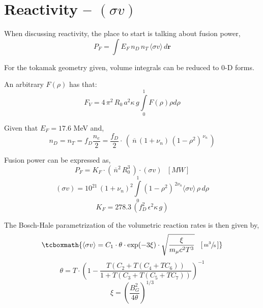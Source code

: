 \section{Reactivity -- $(\sigma v)$}

When discussing reactivity, the place to start is talking about fusion power,
\begin{equation}
	P_F = \int E_F \, n_D \, n_T \, \langle \sigma v \rangle \, d \textbf{r}
\end{equation}

For the tokamak geometry given, volume integrals can be reduced to 0-D forms. 

An arbitrary $F(\rho)$ has that:
\begin{equation}
	F_V = 4 \, \pi ^2 \, R_0 \, a^2 \kappa \, g \int\limits_0^1 F(\rho) \rho d\rho
\end{equation}

Given that $E_F = 17.6$ MeV and,
\begin{equation}
	n_D = n_T = f_D \frac {n_e}{2} = \frac{f_D}{2} \cdot \, \left( \ \overline{n} \, ( 1 + \nu_n ) \, ( 1 - \rho^2 ) ^ {\, \nu_n} \, \right) 
\end{equation}

Fusion power can be expressed as,
\begin{equation}
	P_F = K_F \cdot ( \, \overline{n}^2 \, R_0^3 \, ) \cdot (\sigma v) \ \ \ [MW]
\end{equation}
\begin{equation}
	 (\sigma v) = 10^{21} \, (1+\nu_n)^2 \int\limits_0^1 ( 1 - \rho^2 ) ^ { \, 2 \nu_n} \langle \sigma v \rangle \, \rho \, d\rho
\end{equation}
\begin{equation}
	K_F = 278.3 \, ( f_D^2 \, \epsilon^2 \kappa \, g )
\end{equation}

The Bosch-Hale parametrization of the volumetric reaction rates is then given by,
\begin{equation}
	\tcboxmath{
	\langle \sigma v \rangle = C_1 \cdot \theta \cdot \textnormal{exp}(-3 \xi) \cdot \sqrt{ \frac{\xi  }{m_\mu  c^2 T^3} }  \ \ \, [ \, \sfrac{ \textnormal{m}^3 }{ \textnormal{s} } \, ] }
\end{equation}
\begin{equation} 
	\theta = T \cdot \left(1-\frac{T(C_2+T(C_4+TC_6))}{1+T(C_3+T(C_5+TC_7))}\right) ^{-1}
\end{equation}
\begin{equation}
	\xi = \left(\frac{B_G^2}{4\theta}\right)^{1/3}
\end{equation}

